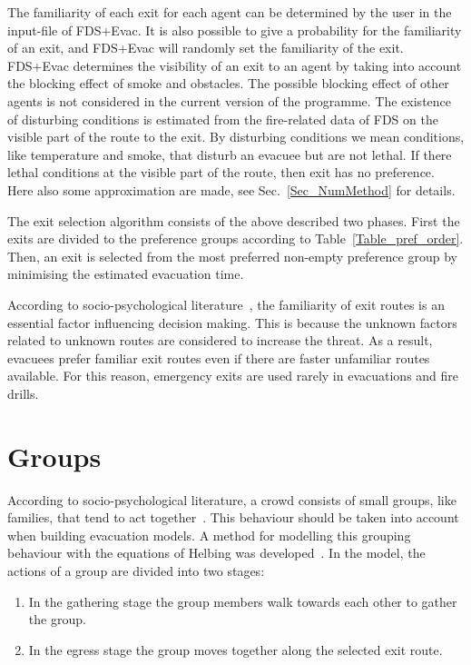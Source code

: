 \documentclass[12pt,a4paper,final,twoside]{stylevk}
\begin{document}
The familiarity of each exit for each agent can be determined by the
user in the input-file of FDS+Evac.  It is also possible to give a
probability for the familiarity of an exit, and FDS+Evac will randomly
set the familiarity of the exit.  FDS+Evac determines the visibility
of an exit to an agent by taking into account the blocking effect of
smoke and obstacles.  The possible blocking effect of other agents is
not considered in the current version of the programme.  The existence
of disturbing conditions is estimated from the fire-related data of
FDS on the visible part of the route to the exit.  By disturbing
conditions we mean conditions, like temperature and smoke, that
disturb an evacuee but are not lethal.  If there lethal conditions at
the visible part of the route, then exit has no preference.  Here also
some approximation are made, see Sec.~\ref{Sec_NumMethod} for details.


The exit selection algorithm consists of the above described two
phases.  First the exits are divided to the preference groups
according to Table~\ref{Table_pref_order}.  Then, an exit is selected from
the most preferred non-empty preference group by minimising the
estimated evacuation time.


According to socio-psychological literature~\cite{Pan06,Proulx1993},
the familiarity of exit routes is an essential factor influencing
decision making.  This is because the unknown factors related to
unknown routes are considered to increase the threat.  As a result,
evacuees prefer familiar exit routes even if there are faster
unfamiliar routes available.  For this reason, emergency exits are used
rarely in evacuations and fire drills.


\section{Groups}\label{Sec_Groups}

\noindent According to socio-psychological literature, a crowd
consists of small groups, like families, that tend to act
together~\cite{Pan06, Matikainen07}.  This behaviour should be taken
into account when building evacuation models.  A method for modelling
this grouping behaviour with the equations of Helbing was
developed~\cite{Heliovaara07}.  In the model, the actions of a group
are divided into two stages:
\begin{enumerate}
\item In the gathering stage the group members walk towards
each other to gather the group.
\item In the egress stage the group moves together along the
selected exit route.%
\end{enumerate}
\end{document}
